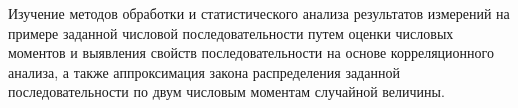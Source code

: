 Изучение методов обработки и статистического анализа результатов измерений на примере
заданной числовой последовательности путем оценки числовых моментов и выявления свойств
последовательности на основе корреляционного анализа, а также аппроксимация закона
распределения заданной последовательности по двум числовым моментам случайной величины.
